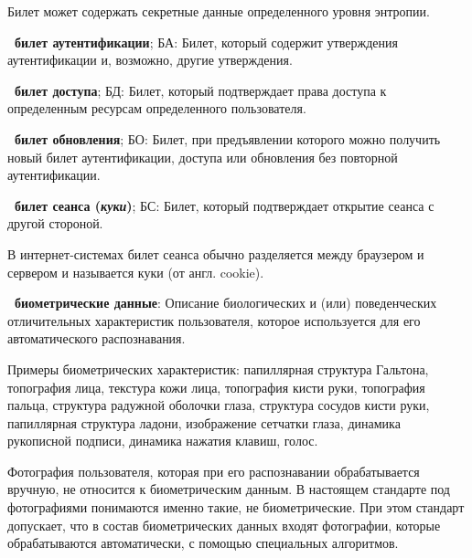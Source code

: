 \begin{note*}
Билет может содержать секретные данные определенного уровня энтропии.
\end{note*}

{\bf \thedefctr~билет аутентификации}; БА:
Билет, который содержит утверждения аутентификации и, возможно, другие
утверждения.

{\bf \thedefctr~билет доступа}; БД:
Билет, который подтверждает права доступа к определенным ресурсам определенного 
пользователя.

{\bf \thedefctr~билет обновления}; БО:
Билет, при предъявлении которого можно получить новый билет 
аутентификации, доступа или обновления без повторной аутентификации.

{\bf \thedefctr~билет сеанса ({\it куки})}; БС:
Билет, который подтверждает открытие сеанса с другой стороной. 

\begin{note*}
В интернет-системах билет сеанса обычно разделяется между браузером и 
сервером и называется куки (от англ. cookie).
\end{note*}

{\bf \thedefctr~биометрические данные}:
Описание биологических и (или) поведенческих отличительных характеристик 
пользователя, которое используется для его автоматического распознавания.

\begin{note}
Примеры биометрических характеристик: папиллярная структура Гальтона, топография
лица, текстура кожи лица, топография кисти руки, топография пальца, структура
радужной оболочки глаза, структура сосудов кисти руки, папиллярная структура
ладони, изображение сетчатки глаза, динамика рукописной подписи, динамика
нажатия клавиш, голос.
\end{note}

\begin{note}
Фотография пользователя, которая при его распознавании обрабатывается вручную,
не относится к биометрическим данным. В настоящем стандарте под фотографиями 
понимаются именно такие, не биометрические. При этом стандарт допускает, что в 
состав биометрических данных входят фотографии, которые обрабатываются 
автоматически, с помощью специальных алгоритмов.
\end{note}

%
% 
%
% 

